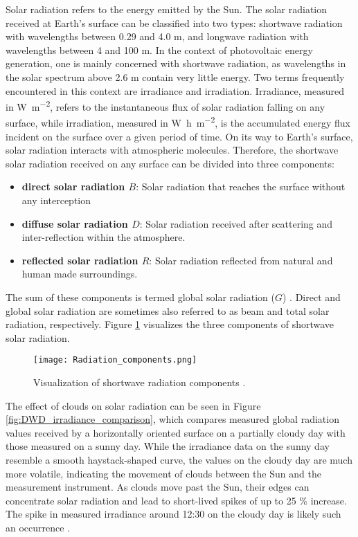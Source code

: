Solar radiation refers to the energy emitted by the Sun. The solar radiation received at Earth's
surface can be classified into two types: shortwave radiation with wavelengths between 0.29 and 4.0
\textmu m, and longwave radiation with wavelengths between 4 and 100 \textmu m. In the context of
photovoltaic energy generation, one is mainly concerned with shortwave radiation, as wavelengths
in the solar spectrum above 2.6 \textmu m contain very little energy.
Two terms frequently encountered in this context are irradiance and irradiation.
Irradiance, measured in \si{\watt\per\square\meter}, refers to the instantaneous flux of solar radiation
falling on any surface, while irradiation, measured in \si{\watt\hour\per\square\meter}, is the accumulated
energy flux incident on the surface over a given period of time. On its way to Earth's
surface, solar radiation interacts with atmospheric molecules. Therefore, the shortwave
solar radiation received on any surface can be divided into three components: 

\begin{itemize}
    \item \textbf{direct solar radiation \(B\)}: Solar radiation that reaches the surface without any interception
    \item \textbf{diffuse solar radiation \(D\)}: Solar radiation received after scattering and inter-reflection within the atmosphere.
    \item \textbf{reflected solar radiation \(R\)}: Solar radiation reflected from natural and human made surroundings.
\end{itemize}

\noindent
The sum of these components is termed global solar radiation (\(G\)) \cite[p. 2f]{CIBSE}.
Direct and global solar radiation are sometimes also referred to as beam and total
solar radiation, respectively. Figure \ref{fig:Radiation_components} visualizes the
three components of shortwave solar radiation.

\begin{figure}
    \centering
    \texttt{[image: Radiation\_components.png]}
    \caption{\small Visualization of shortwave radiation components \cite{Mghouchi}.}
    \label{fig:Radiation_components}
\end{figure}

The effect of clouds on solar radiation can be seen in Figure \ref{fig:DWD_irradiance_comparison},
which compares measured global radiation values received by a horizontally oriented surface on a
partially cloudy day with those measured on a sunny day. While the irradiance data on the sunny
day resemble a smooth haystack-shaped curve, the values on the cloudy day are much more volatile,
indicating the movement of clouds between the Sun and the measurement instrument. As clouds move
past the Sun, their edges can concentrate solar radiation and lead to short-lived spikes of up to 25 \%
increase. The spike in measured irradiance around 12:30 on the cloudy day is likely such an
occurrence \cite[p. 60]{Mayfield}.

